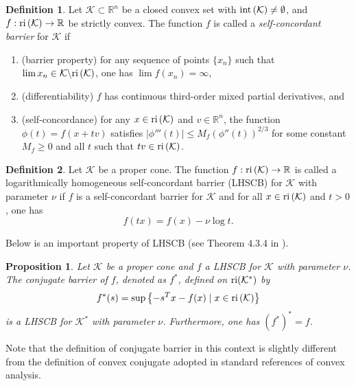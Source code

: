 \documentclass[10pt]{article}
\theoremstyle{definition}
\newtheorem{defin}{Definition}
\theoremstyle{plain}
\newtheorem{prop}{Proposition}
\def\relint{\protect{\textnormal{ri}}}
\begin{document}
\begin{defin}
	Let $\mathcal{K} \subset \mathbb{R}^n$ be a closed convex set with $\textnormal{int}\left(\mathcal{K}\right) \neq \emptyset$, and $f: \relint \left(\mathcal{K}\right) \rightarrow \mathbb{R}$ be strictly convex. The function $f$ is called a \textit{self-concordant barrier} for $\mathcal{K}$  if 
	\begin{enumerate}
		\item (barrier property) for any sequence of points $\{x_n\}$ such that $\lim x_n \in \mathcal{K}\backslash \relint\left(\mathcal{K}\right)$, one has $\lim f(x_n) = \infty$,
		\item (differentiability) $f$ has continuous third-order mixed partial derivatives, and
		\item (self-concordance) for any $x \in \relint\left(\mathcal{K}\right)$ and $v \in \mathbb{R}^n$, the function $\phi(t) = f(x+tv)$ satisfies $|\phi ''' (t)|\leq M_f \left(\phi '' (t)\right)^{2/3}$ for some constant $M_f \geq 0$ and all $t$ such that $tv \in \relint\left(\mathcal{K}\right)$.
	\end{enumerate}
\end{defin}

\begin{defin}
	Let $\mathcal{K}$ be a proper cone. The function $f: \relint\left(\mathcal{K}\right)\rightarrow \mathbb{R}$ is called a logarithmically homogeneous self-concordant barrier (LHSCB) for $\mathcal{K}$ with parameter $\nu$ if $f$ is a self-concordant barrier for $\mathcal{K}$ and for all $x \in \relint\left(\mathcal{K}\right)$ and $t>0$, one has 
	\[f(tx) = f(x) - \nu \log t.\]
\end{defin}

Below is an important property of LHSCB (see Theorem 4.3.4 in \cite{Akle_thesis}).
\begin{prop} \label{conjugate_of_LHSCB_is_LHSCB_for_dual}
	Let $\mathcal{K}$ be a proper cone and $f$ a LHSCB for $\mathcal{K}$ with parameter $\nu$. The \textnormal{conjugate barrier} of $f$, denoted as $f^*$, defined on $\relint(\mathcal{K}^*)$ by 
	\[f^*(s) = \sup \left\{-s^Tx -f(x) \mid x\in \relint\left(\mathcal{K}\right)  \right\}\]
	is a LHSCB for $\mathcal{K}^*$ with parameter $\nu$. Furthermore, one has $(f^*)^* = f$.
\end{prop}
Note that the definition of conjugate barrier in this context is slightly different from the definition of convex conjugate adopted in standard references of convex analysis. \\
\end{document}
